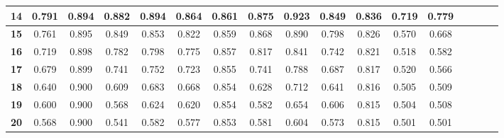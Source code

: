 \begin{table*}[!t]
\begin{tabular}{|c|c|c|c|c|c|c|c|c|c|c|c|c|c|c|c|c|}
\hline
\bfseries 14 & 0.791 & 0.894 & 0.882 & 0.894 & 0.864 & 0.861 & 0.875 & 0.923 & 0.849 & 0.836 & 0.719 & 0.779 \\
\hline
\bfseries 15 & 0.761 & 0.895 & 0.849 & 0.853 & 0.822 & 0.859 & 0.868 & 0.890 & 0.798 & 0.826 & 0.570 & 0.668 \\
\hline
\bfseries 16 & 0.719 & 0.898 & 0.782 & 0.798 & 0.775 & 0.857 & 0.817 & 0.841 & 0.742 & 0.821 & 0.518 & 0.582 \\
\hline
\bfseries 17 & 0.679 & 0.899 & 0.741 & 0.752 & 0.723 & 0.855 & 0.741 & 0.788 & 0.687 & 0.817 & 0.520 & 0.566 \\
\hline
\bfseries 18 & 0.640 & 0.900 & 0.609 & 0.683 & 0.668 & 0.854 & 0.628 & 0.712 & 0.641 & 0.816 & 0.505 & 0.509 \\
\hline
\bfseries 19 & 0.600 & 0.900 & 0.568 & 0.624 & 0.620 & 0.854 & 0.582 & 0.654 & 0.606 & 0.815 & 0.504 & 0.508 \\
\hline
\bfseries 20 & 0.568 & 0.900 & 0.541 & 0.582 & 0.577 & 0.853 & 0.581 & 0.604 & 0.573 & 0.815 & 0.501 & 0.501 \\
\hline
\end{tabular}
\end{table*}
